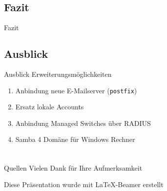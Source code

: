 \documentclass[handout,svgnames]{beamer}
\begin{document}
\subsection{Fazit}
\begin{frame}{Fazit}

\end{frame}


\subsection{Ausblick}
\begin{frame}{Ausblick}
	Erweiterungsmöglichkeiten
	\begin{enumerate}
		\item Anbindung neue E-Mailserver (\texttt{postfix})
		\item Ersatz lokale Accounts
		\item Anbindung Managed Switches über RADIUS
		\item Samba 4 Domäne für Windows Rechner
	\end{enumerate}
\end{frame}

\section{}%
\begin{frame}{Quellen}
	Vielen Dank für Ihre Aufmerksamkeit
	
	\medskip Diese Präsentation wurde mit \LaTeX{}-Beamer erstellt
\end{frame}
\end{document}
